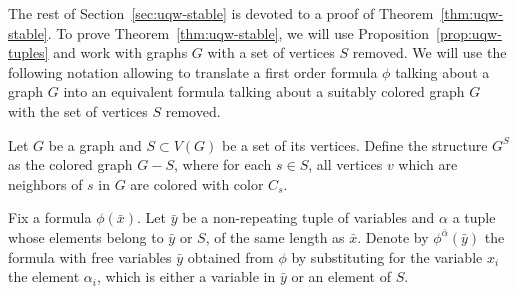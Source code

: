 \medskip
The rest of Section~\ref{sec:uqw-stable} is devoted to a proof of Theorem~\ref{thm:uqw-stable}.
To prove Theorem~\ref{thm:uqw-stable}, we will use Proposition~\ref{prop:uqw-tuples} and work with graphs $G$
with a set of vertices $S$ removed.
We will use the following notation allowing to translate a first order formula $\phi$ talking about a graph $G$ into an equivalent formula talking about a suitably colored  graph $G$ with the set of vertices $S$ removed.

Let $G$ be a graph and $S\subset V(G)$
be a set of its vertices.
Define the structure $G^{S}$
as the colored graph $G-S$, where for each $s\in S$, all vertices $v$
which are neighbors of $s$ in $G$ are colored with color $C_s$.

Fix a formula $\phi(\bar x)$.
Let $\bar y$ be a non-repeating tuple of variables and $\alpha$ a tuple whose elements belong to $\bar y$ or $S$, of the same length as $\bar x$.
Denote by $\phi^{\bar \alpha}(\bar y)$ the formula with free variables $\bar y$ obtained from $\phi$ by substituting for the variable $x_i$ the element $\alpha_i$, which is either a variable in $\bar y$  or an element of $S$. 


